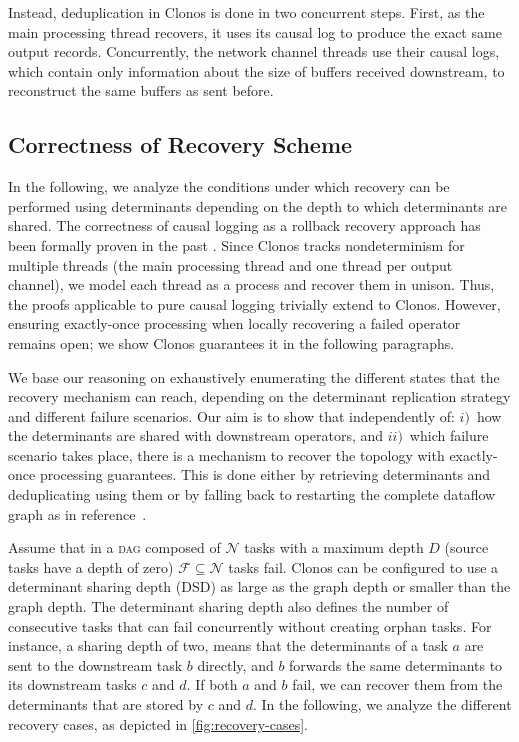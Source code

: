 \documentclass[sigconf]{acmart}
\begin{document}
Instead, deduplication in Clonos is done in two concurrent steps. First, as the main processing thread recovers, it uses its causal log to produce the exact same output records. Concurrently, the network channel threads use their causal logs, which contain only information about the size of buffers received downstream, to reconstruct the same buffers as sent before. %

\subsection{Correctness of Recovery Scheme}
\label{sec:determinant-recovery}


In the following, we analyze the conditions under which recovery can be performed using determinants depending on the depth to which determinants are shared. The correctness of causal logging as a rollback recovery approach has been formally proven in the past \cite{alvisi1996understanding, alvisi1998message}. Since Clonos tracks nondeterminism for multiple threads (the main processing thread and one thread per output channel), we model each thread as a process and recover them in unison. Thus, the proofs applicable to pure causal logging trivially extend to Clonos. However, ensuring exactly-once processing when locally recovering a failed operator remains open;
we show Clonos guarantees it in the following paragraphs.

We base our reasoning on exhaustively enumerating the different states that the recovery mechanism can reach, depending on the determinant replication strategy and different failure scenarios. Our aim is to show that independently of: $i)$~how the determinants are shared with downstream operators, and $ii)$~which failure scenario takes place, there is a mechanism to recover the topology with exactly-once processing guarantees.
This is done either by retrieving determinants and deduplicating using them or by falling back to restarting the complete dataflow graph as in reference~\cite{CarboneEF17}.

Assume that in a \textsc{dag} composed of $\mathcal{N}$ tasks with a maximum depth $D$ (source tasks have a depth of zero) $\mathcal{F} \subseteq \mathcal{N}$ tasks fail. Clonos can be configured to use a determinant sharing depth (DSD) as large as the graph depth or smaller than the graph depth.
The determinant sharing depth also defines the number of consecutive tasks that can fail concurrently without creating orphan tasks. 
For instance, a sharing depth of two, means that the determinants of a task $a$ are sent to the downstream task $b$ directly, and $b$ forwards the same determinants to its downstream tasks $c$ and $d$. If both $a$ and $b$ fail, we can recover them from the determinants that are stored by $c$ and $d$. In the following, we analyze the different recovery cases, as depicted in \autoref{fig:recovery-cases}.
\end{document}
